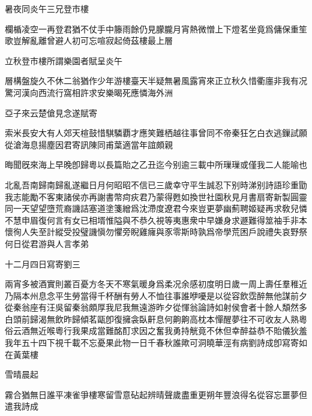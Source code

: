 \documentclass{zhvt-classic-Miya}
\begin{document}
\begin{fw}暑夜同炎午三兄登市樓\end{fw}

欄楯凌空一再登君猶不仗手中籐雨餘仍見朦朧月宵熱微憎上下燈茗坐竟爲傭保重笙歌豈解亂離曾避人初可忘喧寂起倚茲樓最上層

\begin{fw}立秋登市樓所謂樂園者賦呈炎午\end{fw}

層構盤旋久不休二翁猶作少年游樓臺天半疑無暑風露宵來正立秋久惜衢廛非我有况驚河漢向西流行窩相許求安樂暍死應憐海外洲

\begin{fw}亞子來云楚傖見念遂賦寄\end{fw}

索米長安大有人郊天楦鼓惜騏驎覇才應笑難栖越往事曾同不帝秦狂乞白衣逃鏁試願從滄海息揚塵因君寄訊陳同甫葉適當年誼頗親

\begin{fw}晦聞旣來海上早晚卽歸粵以長篇貽之乙丑迄今别逾三載中所璅璅或僅我二人能喻也\end{fw}

北亂吾南歸南歸亂遂繼日月何昭昭不信已三歲幸守平生誠忍下别時涕别詩語珍重勖我志能勵不客東諸侯亦再謝書幣疴疢君乃蒙得甦如換世社園秋見月書扇寄新製圓靈同一天望望墮荒裔譏詰塞道塗箋繒爲沈滯度遼君今來豈更夢幽薊聘姬疑再求敎兒憐不慧申眉復何言有女已相壻惟隘與不恭久視等夷惠衆中早嫌身求遯難得筮袖手非本懷徇人失至計縱受投璧譏愼勿懼旁睨雞癕與豕零斯時孰爲帝學荒困戶說禮失哀野祭何日從君游與人言孝弟

\begin{fw}十二月四日寫寄劉三\end{fw}

兩宵多被酒實則叢百憂方冬天不寒氣暖身爲柔况余感初度明日歲一周上壽任羣稚近乃隔本州息念平生勞當得千杯酬有勞人不恤往事誰咿嚘是以從容飲霑醉無他謀前夕從秦翁座有汪吳留秦翁頗厚我尼我無遠游昨夕從惲翁論詩如射侯會者十餘人頽然多白頭前歸渴無飲昨歸傾茗甌卽復擁衾臥鼾息何齁齁高枕本憚醒夢往不可收友人熟粵俗云酒無近喉粵行我果成當難酩酊求因之奮我勇持觥竟不休但幸醉益恭不貽儀狄羞我年五十四下視千載不忘憂果此物一日千春秋誰歟可洞曉華涇有病劉詩成卽寫寄如在黃葉樓

\begin{fw}雪晴晨起\end{fw}

霧合猶無日誰平凍雀爭樓寒留雪意砧起辨晴聲歲盡重更朔年豐浪得名從容忘噩夢但遣我詩成
\end{document}
